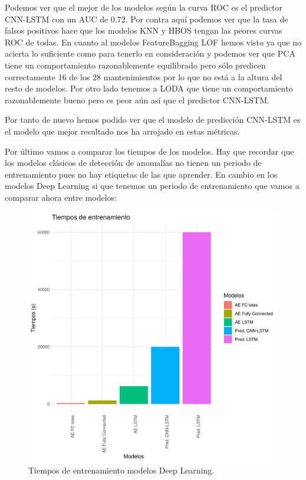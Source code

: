 Podemos ver que el mejor de los modelos según la curva ROC es el predictor CNN-LSTM con un AUC de $0.72$. Por contra aquí podemos ver que la tasa de falsos positivos hace que los modelos KNN y HBOS tengan las peores curvas ROC de todas. En cuanto al modelos FeatureBagging LOF hemos visto ya que no acierta lo suficiente como para tenerlo en consideración y podemos ver que PCA tiene un comportamiento razonablemente equilibrado pero sólo predicen correctamente 16 de los 28 mantenimientos por lo que no está a la altura del resto de modelos. Por otro lado tenemos a LODA que tiene un comportamiento razonablemente bueno pero es peor aún así que el predictor CNN-LSTM.

Por tanto de nuevo hemos podido ver que el modelo de predicción CNN-LSTM es el modelo que mejor resultado nos ha arrojado en estas métricas.

Por último vamos a comparar los tiempos de los modelos. Hay que recordar que los modelos clásicos de detección de anomalías no tienen un periodo de entrenamiento pues no hay etiquetas de las que aprender. En cambio en los modelos Deep Learning si que tenemos un periodo de entrenamiento que vamos a comparar ahora entre modelos:

\begin{figure}[H]
	\centering
	\includegraphics[scale=0.65]{imagenes/tiempos_entrenamiento.png}
	\caption{Tiempos de entrenamiento modelos Deep Learning.}
	\label{img:tiempos-entrenamiento}
\end{figure}

